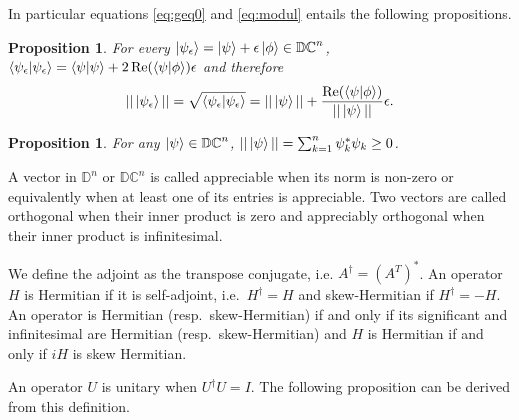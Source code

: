 \documentclass{article}
\newtheorem{proposition}[theorem]{Proposition}
\newcommand{\D}{\mathbb{D}}
\newcommand{\DC}{\mathbb{DC}}
\newcommand{\e}{\epsilon}
\renewcommand{\Re}{\operatorname{Re}}
\begin{document}
In particular equations \ref{eq:geq0} and \ref{eq:modul} entails the following propositions.

\begin{proposition}
 For every $\ket{\psi_\e} = \ket{\psi} + \e \ket{\phi} \in \DC^n$, $\braket{\psi_\e|\psi_\e} = \braket{\psi|\psi} + 2\Re(\braket{\psi|\phi}) \e$ and therefore
\begin{equation}\label{eq:norm}
 ||\ket{\psi_\e}|| = \sqrt{\braket{\psi_\e|\psi_\e}} = ||\ket\psi|| + \frac{\Re(\braket{\psi|\phi})}{||\ket\psi||}\e.
\end{equation}
\end{proposition}
\begin{proposition}
 For any $\ket{\psi} \in \DC^n$, $||\ket\psi|| = \sum_{k=1}^n \psi_k^* \psi_k \geq 0$.
\end{proposition}

A vector in $\D^n$ or $\DC^n$ is called appreciable when its norm is non-zero or equivalently when at least one of its entries is appreciable. Two vectors are called orthogonal when their inner product is zero and appreciably orthogonal when their inner product is infinitesimal.

We define the adjoint as the transpose conjugate, i.e. $A^\dagger = (A^T)^*$. An operator $H$ is Hermitian if it is self-adjoint, i.e.\ $H^\dagger = H$ and skew-Hermitian if $H^\dagger = -H$. An operator is Hermitian (resp.\ skew-Hermitian) if and only if its significant and infinitesimal are Hermitian (resp.\ skew-Hermitian) and $H$ is Hermitian if and only if $iH$ is skew Hermitian.

An operator $U$ is unitary when $U^\dagger U = I$. The following proposition can be derived from this definition.
\end{document}
